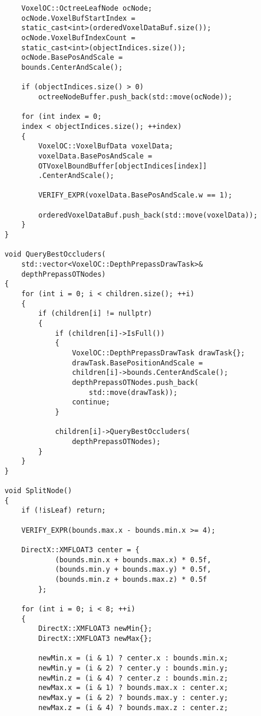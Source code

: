 \begin{lstlisting}
        VoxelOC::OctreeLeafNode ocNode;
        ocNode.VoxelBufStartIndex = 
        static_cast<int>(orderedVoxelDataBuf.size());
        ocNode.VoxelBufIndexCount = 
        static_cast<int>(objectIndices.size());
        ocNode.BasePosAndScale = 
        bounds.CenterAndScale();

        if (objectIndices.size() > 0)
            octreeNodeBuffer.push_back(std::move(ocNode));

        for (int index = 0; 
        index < objectIndices.size(); ++index)
        {
            VoxelOC::VoxelBufData voxelData;
            voxelData.BasePosAndScale = 
            OTVoxelBoundBuffer[objectIndices[index]]
            .CenterAndScale();

            VERIFY_EXPR(voxelData.BasePosAndScale.w == 1);

            orderedVoxelDataBuf.push_back(std::move(voxelData));
        }
    }

    void QueryBestOccluders(
        std::vector<VoxelOC::DepthPrepassDrawTask>& 
        depthPrepassOTNodes)
    {
        for (int i = 0; i < children.size(); ++i)
        {
            if (children[i] != nullptr)
            {
                if (children[i]->IsFull())
                {
                    VoxelOC::DepthPrepassDrawTask drawTask{};
                    drawTask.BasePositionAndScale = 
                    children[i]->bounds.CenterAndScale();
                    depthPrepassOTNodes.push_back(
                        std::move(drawTask));
                    continue;
                }
                
                children[i]->QueryBestOccluders(
                    depthPrepassOTNodes);
            }
        }
    }

    void SplitNode()
    {
        if (!isLeaf) return;

        VERIFY_EXPR(bounds.max.x - bounds.min.x >= 4);

        DirectX::XMFLOAT3 center = {
                (bounds.min.x + bounds.max.x) * 0.5f,
                (bounds.min.y + bounds.max.y) * 0.5f,
                (bounds.min.z + bounds.max.z) * 0.5f
            };

        for (int i = 0; i < 8; ++i)
        {
            DirectX::XMFLOAT3 newMin{};
            DirectX::XMFLOAT3 newMax{};

            newMin.x = (i & 1) ? center.x : bounds.min.x;
            newMin.y = (i & 2) ? center.y : bounds.min.y;
            newMin.z = (i & 4) ? center.z : bounds.min.z;
            newMax.x = (i & 1) ? bounds.max.x : center.x;
            newMax.y = (i & 2) ? bounds.max.y : center.y;
            newMax.z = (i & 4) ? bounds.max.z : center.z;


\end{lstlisting}
